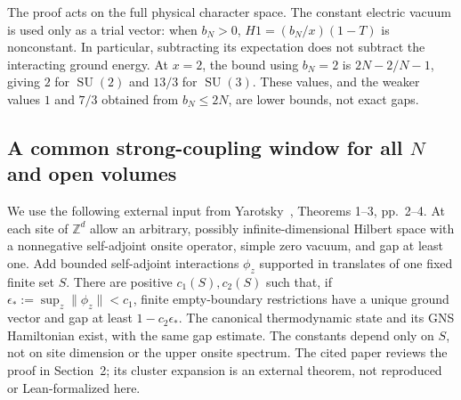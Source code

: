 \documentclass[11pt,letterpaper]{article}
\newcommand{\Z}{\mathbb Z}
\newcommand{\SU}{\operatorname{SU}}
\theoremstyle{definition}
\numberwithin{equation}{section}
\begin{document}
The proof acts on the full physical character space. The constant electric
vacuum is used only as a trial vector: when $b_N>0$,
$H1=(b_N/x)(1-T)$ is nonconstant. In particular, subtracting its expectation
does not subtract the interacting ground energy. At $x=2$, the bound using
$b_N=2$ is $2N-2/N-1$, giving $2$ for $\SU(2)$ and $13/3$ for $\SU(3)$.
These values, and the weaker values $1$ and $7/3$ obtained from $b_N\le2N$,
are lower bounds, not exact gaps.

\subsection{A common strong-coupling window for all $N$ and open volumes}

We use the following external input from Yarotsky~\cite{yarotsky},
Theorems 1--3, pp.~2--4. At each site of $\Z^d$ allow an arbitrary,
possibly infinite-dimensional Hilbert space with a nonnegative
self-adjoint onsite operator, simple zero vacuum, and gap at least one.
Add bounded self-adjoint interactions $\phi_z$ supported in translates of
one fixed finite set $S$. There are positive $c_1(S),c_2(S)$ such that,
if $\epsilon_*:=\sup_z\|\phi_z\|<c_1$, finite empty-boundary restrictions
have a unique ground vector and gap at least $1-c_2\epsilon_*$. The
canonical thermodynamic state and its GNS Hamiltonian exist, with the same
gap estimate. The constants depend only on $S$, not on site dimension or
the upper onsite spectrum. The cited paper reviews the proof in Section~2;
its cluster expansion is an external theorem, not reproduced or
Lean-formalized here.
\end{document}
